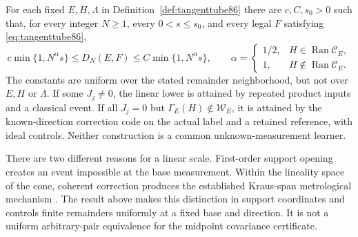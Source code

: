 \begin{theorem}
\label{thm:tubedichotomy86}
For each fixed $E,H,\Lambda$ in Definition~\ref{def:tangenttube86}
there are $c,C,s_0>0$ such that, for every integer $N\ge1$, every
$0<s\le s_0$, and every legal $F$ satisfying
\eqref{eq:tangenttube86},
\begin{equation}\label{eq:tubedichotomy86}
 c\min\{1,N^\alpha s\}\le D_N(E,F)
       \le C\min\{1,N^\alpha s\},\qquad
 \alpha=\begin{cases}
  1/2,&H\in\operatorname{Ran}\mathcal C_E,\\
  1,&H\notin\operatorname{Ran}\mathcal C_E.
 \end{cases}
\end{equation}
The constants are uniform over the stated remainder neighborhood,
but not over $E,H$ or $\Lambda$.  If some $J_j\ne0$, the linear
lower is attained by repeated product inputs and a classical event.
If all $J_j=0$ but $\Gamma_E(H)\notin\mathcal W_E$, it is attained
by the known-direction correction code on the actual label and a
retained reference, with ideal controls.  Neither construction is
a common unknown-measurement learner.
\end{theorem}

There are two different reasons for a linear scale.  First-order
support opening creates an event impossible at the base measurement.
Within the lineality space of the cone, coherent correction produces
the established Kraus-span metrological mechanism \cite{ZJ84,KL84}.
The result above makes this distinction in support coordinates and
controls finite remainders uniformly at a fixed base and direction.
It is not a uniform arbitrary-pair equivalence for the midpoint
covariance certificate.

